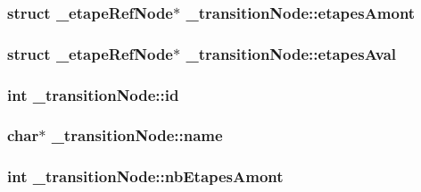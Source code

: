 \subsubsection[{\texorpdfstring{etapes\+Amont}{etapesAmont}}]{\setlength{\rightskip}{0pt plus 5cm}struct {\bf \+\_\+etape\+Ref\+Node}$\ast$ \+\_\+transition\+Node\+::etapes\+Amont}\hypertarget{struct__transitionNode_a3d5635adc21c4fb47681669b7ca1cf59}{}\label{struct__transitionNode_a3d5635adc21c4fb47681669b7ca1cf59}
\subsubsection[{\texorpdfstring{etapes\+Aval}{etapesAval}}]{\setlength{\rightskip}{0pt plus 5cm}struct {\bf \+\_\+etape\+Ref\+Node}$\ast$ \+\_\+transition\+Node\+::etapes\+Aval}\hypertarget{struct__transitionNode_ad7b657011977a90b5302903dca76c698}{}\label{struct__transitionNode_ad7b657011977a90b5302903dca76c698}
\subsubsection[{\texorpdfstring{id}{id}}]{\setlength{\rightskip}{0pt plus 5cm}int \+\_\+transition\+Node\+::id}\hypertarget{struct__transitionNode_aecb2bae359be27f06a0df7c7312d4628}{}\label{struct__transitionNode_aecb2bae359be27f06a0df7c7312d4628}
\subsubsection[{\texorpdfstring{name}{name}}]{\setlength{\rightskip}{0pt plus 5cm}char$\ast$ \+\_\+transition\+Node\+::name}\hypertarget{struct__transitionNode_a607c327fc2b516b64e1ba69b9bac97fe}{}\label{struct__transitionNode_a607c327fc2b516b64e1ba69b9bac97fe}
\subsubsection[{\texorpdfstring{nb\+Etapes\+Amont}{nbEtapesAmont}}]{\setlength{\rightskip}{0pt plus 5cm}int \+\_\+transition\+Node\+::nb\+Etapes\+Amont}\hypertarget{struct__transitionNode_aae8fd1a66f605f0b96b4acf380331a3e}{}\label{struct__transitionNode_aae8fd1a66f605f0b96b4acf380331a3e}
